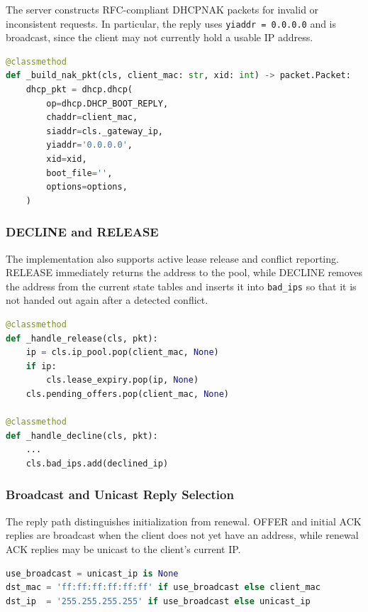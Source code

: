 \documentclass[11pt,a4paper]{article}
\begin{document}
The server constructs RFC-compliant DHCPNAK packets for invalid or inconsistent requests.
In particular, the reply uses \texttt{yiaddr = 0.0.0.0} and is broadcast, since the
client may not currently hold a usable IP address.

\begin{lstlisting}[language=Python]
@classmethod
def _build_nak_pkt(cls, client_mac: str, xid: int) -> packet.Packet:
    dhcp_pkt = dhcp.dhcp(
        op=dhcp.DHCP_BOOT_REPLY,
        chaddr=client_mac,
        siaddr=cls._gateway_ip,
        yiaddr='0.0.0.0',
        xid=xid,
        boot_file='',
        options=options,
    )
\end{lstlisting}

\subsubsection{DECLINE and RELEASE}

The implementation also supports active lease release and conflict reporting. RELEASE
immediately returns the address to the pool, while DECLINE removes the address from the
current state tables and inserts it into \mbox{\texttt{bad\_ips}} so that it is not handed out
again after a detected conflict.

\begin{lstlisting}[language=Python]
@classmethod
def _handle_release(cls, pkt):
    ip = cls.ip_pool.pop(client_mac, None)
    if ip:
        cls.lease_expiry.pop(ip, None)
    cls.pending_offers.pop(client_mac, None)

@classmethod
def _handle_decline(cls, pkt):
    ...
    cls.bad_ips.add(declined_ip)
\end{lstlisting}

\subsubsection{Broadcast and Unicast Reply Selection}

The reply path distinguishes initialization from renewal. OFFER and initial ACK replies
are broadcast when the client does not yet have an address, while renewal ACK replies may
be unicast to the client's current IP.

\begin{lstlisting}[language=Python]
use_broadcast = unicast_ip is None
dst_mac = 'ff:ff:ff:ff:ff:ff' if use_broadcast else client_mac
dst_ip  = '255.255.255.255' if use_broadcast else unicast_ip
\end{lstlisting}
\end{document}

